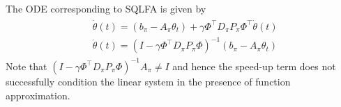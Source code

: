 The ODE corresponding to SQLFA is given by
\begin{align}
\begin{split}
&\dot{\theta}(t)=(b_\pi-A_\pi\theta_t)+\gamma\Phi^\top D_\pi P_\pi\Phi^\top\dot{\theta}(t)\\
&\dot{\theta}(t)=(I-\gamma\Phi^\top D_\pi P_\pi\Phi)^{-1}(b_\pi-A_\pi\theta_t)
\end{split}
\end{align}
Note that $(I-\gamma\Phi^\top D_\pi P_\pi\Phi)^{-1}A_\pi\neq I$ and hence the speed-up term does not successfully condition the linear system in the presence of function approximation.\par

\begin{comment}
The design corresponding to the above is given by $g_3=\begin{bmatrix}0\\ b_\pi\end{bmatrix}$, and $H_3=\begin{bmatrix} -A_\pi & I \\ -A_\pi & 0\end{bmatrix}$. The Eigen values of this design can be found by solving the following equations
\begin{align}
|\Lambda I-H|=\begin{bmatrix} \Lambda+A_\pi & -I \\ A_\pi & \Lambda\end{bmatrix}=(\Lambda+A_\pi)\Lambda+A_\pi=0
\end{align}
Thus if $\mu$ is a real Eigen value of $A_\pi$ and $\mu’_{1,2}$ corresponding Eigen values of $H_3$, we have the relation
\begin{align}
\mu’_{i}=\frac{\mu\pm\sqrt{\mu^2-4\mu}}{2}, i=1,2
\end{align}
Notice that for small values of $\mu$, $\mu’_i, i=1,2$ have imaginary parts and the real part is $\mu/2$. Thus this new scheme will be oscillatory (due to imaginary parts) and have poor convergence compared to \tdo since the real part gets divided by a factor of $2$.
\end{comment}
